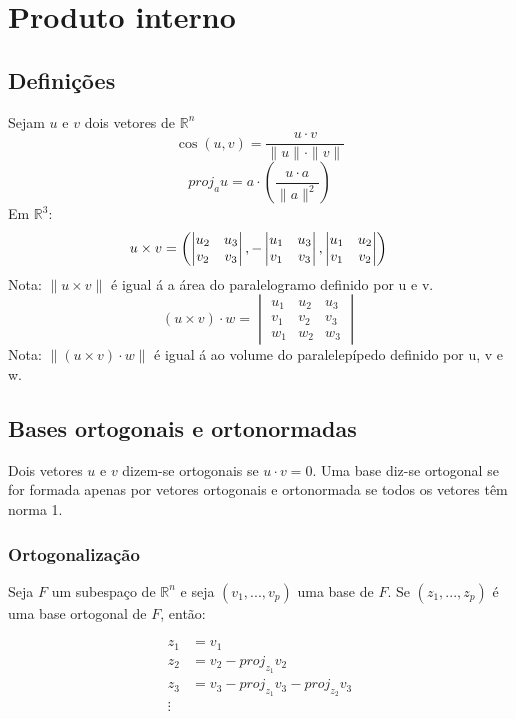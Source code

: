 \documentclass[10pt,a4paper]{report}
\begin{document}
\chapter{Produto interno}
\section{Definições}
Sejam $u$ e $v$ dois vetores de $\mathbb{R}^n$
$$
\cos (u, v) = \frac{u \cdot v}{\|u\| \cdot \|v\|}
$$
$$
proj_au= a \cdot \left(\frac{u \cdot a}{\|a\|^2}\right)
$$
\vspace{0.5cm}
Em $\mathbb{R}^3$:
\vspace{0.5cm}
$$
u \times v = \left( \begin {vmatrix} u_2 & u_3 \\ v_2 & v_3 \end {vmatrix} ,
- \begin {vmatrix} u_1 & u_3 \\ v_1 & v_3 \end {vmatrix} ,
\begin {vmatrix} u_1 & u_2 \\ v_1 & v_2 \end {vmatrix}  \right)\\
$$
Nota: $\|u \times v\|$ é igual á a área do paralelogramo definido por u e v.
$$
(u \times v) \cdot w = \begin{vmatrix}
u_1 & u_2 & u_3 \\
v_1 & v_2 & v_3 \\
w_1 & w_2 & w_3
\end{vmatrix}
$$
Nota: $\|(u \times v) \cdot w\|$ é igual á ao volume do paralelepípedo definido por u, v e w.

\section{Bases ortogonais e ortonormadas}
Dois vetores $u$ e $v$ dizem-se ortogonais se $u \cdot v = 0$. Uma base diz-se ortogonal se for formada apenas por vetores ortogonais e ortonormada se todos os vetores têm norma 1.

\subsection{Ortogonalização}
Seja $F$ um subespaço de $\mathbb{R}^n$ e seja $(v_1, ..., v_p)$ uma base de $F$. Se $(z_1, ..., z_p)$ é uma base ortogonal de $F$, então:

\begin{align}
z_1 &= v_1\\
z_2 &= v_2 - proj_{z_1} v_2\\
z_3 &= v_3 - proj_{z_1} v_3 - proj_{z_2} v_3\\
\vdots
\end{align}
\end{document}
